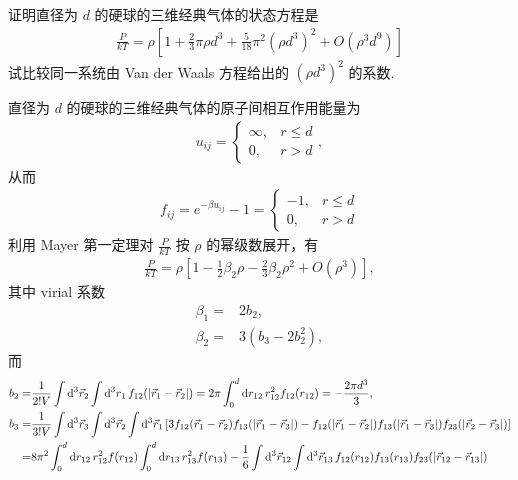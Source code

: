\documentclass{assignment}
\begin{document}
\begin{prob}
    证明直径为 $d$ 的硬球的三维经典气体的状态方程是
    \begin{align}
        \frac{P}{kT}=\rho\left[1+\frac{2}{3}\pi\rho d^3+\frac{5}{18}\pi^2(\rho d^3)^2+O(\rho^3d^9)\right]
    \end{align}
    试比较同一系统由 Van der Waals 方程给出的 $(\rho d^3)^2$ 的系数.
\end{prob}
\begin{pf}
    直径为 $d$ 的硬球的三维经典气体的原子间相互作用能量为
    \begin{align}
        u_{ij}=\left\{\begin{array}{ll}
            \infty,&r\leq d\\
            0,&r>d
        \end{array}\right.,
    \end{align}
    从而
    \begin{align}
        f_{ij}=e^{-\beta u_{ij}}-1=\left\{\begin{array}{ll}
            -1,&r\leq d\\
            0,&r>d
        \end{array}\right.
    \end{align}
    利用 Mayer 第一定理对 $\frac{P}{kT}$ 按 $\rho$ 的幂级数展开，有
    \begin{align}
        \frac{P}{kT}=\rho\left[1-\frac{1}{2}\beta_2\rho-\frac{2}{3}\beta_2\rho^2+O(\rho^3)\right],
    \end{align}
    其中 virial 系数
    \begin{align}
        \beta_1=&2b_2,\\
        \beta_2=&3(b_3-2b_2^2),
    \end{align}
    而
    \begin{align}
        b_2=&\frac{1}{2!V}\int\mathrm{d}^3\vec{r}_2\int\mathrm{d}^3r_1\,f_{12}(\abs{\vec{r}_1-\vec{r}_2})=2\pi\int_0^d\mathrm{d}r_{12}\,r_{12}^2f_{12}(r_{12})=-\frac{2\pi d^3}{3},\\
        \notag b_3=&\frac{1}{3!V}\int\mathrm{d}^3\vec{r}_3\int\mathrm{d}^3\vec{r}_2\int\mathrm{d}^3\vec{r}_1\,[3f_{12}(\vec{r}_1-\vec{r}_2)f_{13}(\abs{\vec{r}_1-\vec{r}_3})-f_{12}(\abs{\vec{r}_1-\vec{r}_2})f_{13}(\abs{\vec{r}_1-\vec{r}_3})f_{23}(\abs{\vec{r}_2-\vec{r}_3})]\\
        \notag=&8\pi^2\int_0^d\mathrm{d}r_{12}\,r_{12}^2f(r_{12})\int_0^d\mathrm{d}r_{13}\,r_{13}^2f(r_{13})-\frac{1}{6}\int\mathrm{d}^3\vec{r}_{12}\int\mathrm{d}^3\vec{r}_{13}\,f_{12}(r_{12})f_{13}(r_{13})f_{23}(\abs{\vec{r}_{12}-\vec{r}_{13}})\\

\end{align}
\end{pf}
\end{document}
